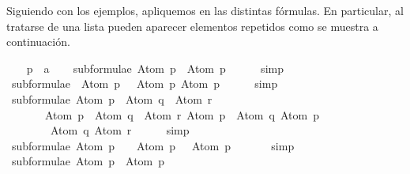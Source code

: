 \begin{isabellebody}
\begin{isamarkuptext}
  Siguiendo con los ejemplos, apliquemos  en
  las distintas fórmulas. En particular, al tratarse de una lista pueden 
  aparecer elementos repetidos como se muestra a continuación.%
\end{isamarkuptext}\isamarkuptrue%
\isamarkupfalse%
\isanewline
{}\isanewline
%
\isadelimproof
\ \ %
\endisadelimproof
%
\isatagproof
{}\isamarkupfalse%
\ p\ {\isacharcolon}{\isacharcolon}\ {\isacharprime}a\isanewline
\isanewline
\ \ \isamarkupfalse%
\ {\isachardoublequoteopen}subformulae\ {\isacharparenleft}Atom\ p{\isacharparenright}\ {\isacharequal}\ {\isacharbrackleft}Atom\ p{\isacharbrackright}{\isachardoublequoteclose}\isanewline
\ \ \ \ \isamarkupfalse%
\ simp\isanewline
\isanewline
\ \ \isamarkupfalse%
\ {\isachardoublequoteopen}subformulae\ {\isacharparenleft}\isactrlbold {\isasymnot}\ {\isacharparenleft}Atom\ p{\isacharparenright}{\isacharparenright}\ {\isacharequal}\ {\isacharbrackleft}\isactrlbold {\isasymnot}\ {\isacharparenleft}Atom\ p{\isacharparenright}{\isacharcomma}\ Atom\ p{\isacharbrackright}{\isachardoublequoteclose}\isanewline
\ \ \ \ \isamarkupfalse%
\ simp\isanewline
\isanewline
\ \ \isamarkupfalse%
\ {\isachardoublequoteopen}subformulae\ {\isacharparenleft}{\isacharparenleft}Atom\ p\ \isactrlbold {\isasymrightarrow}\ Atom\ q{\isacharparenright}\ \isactrlbold {\isasymor}\ Atom\ r{\isacharparenright}\ {\isacharequal}\ \isanewline
\ \ \ \ \ \ \ {\isacharbrackleft}{\isacharparenleft}Atom\ p\ \isactrlbold {\isasymrightarrow}\ Atom\ q{\isacharparenright}\ \isactrlbold {\isasymor}\ Atom\ r{\isacharcomma}\ Atom\ p\ \isactrlbold {\isasymrightarrow}\ Atom\ q{\isacharcomma}\ Atom\ p{\isacharcomma}\ \isanewline
\ \ \ \ \ \ \ \ Atom\ q{\isacharcomma}\ Atom\ r{\isacharbrackright}{\isachardoublequoteclose}\isanewline
\ \ \ \ \isamarkupfalse%
\ simp\isanewline
\isanewline
\ \ \isamarkupfalse%
\ {\isachardoublequoteopen}subformulae\ {\isacharparenleft}Atom\ p\ \isactrlbold {\isasymand}\ {\isasymbottom}{\isacharparenright}\ {\isacharequal}\ {\isacharbrackleft}Atom\ p\ \isactrlbold {\isasymand}\ {\isasymbottom}{\isacharcomma}\ Atom\ p{\isacharcomma}\ {\isasymbottom}{\isacharbrackright}{\isachardoublequoteclose}\isanewline
\ \ \ \ \isamarkupfalse%
\ simp\isanewline
\isanewline
\ \ \isamarkupfalse%
\ {\isachardoublequoteopen}subformulae\ {\isacharparenleft}Atom\ p\ \isactrlbold {\isasymor}\ Atom\ p{\isacharparenright}\ {\isacharequal}\ \isanewline

\end{isabellebody}
